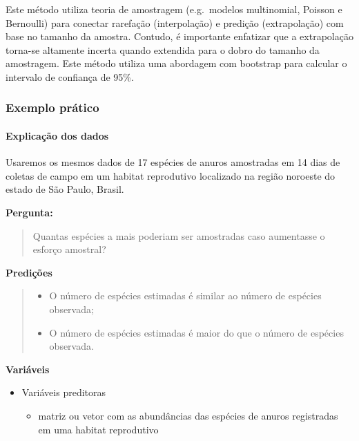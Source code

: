 \documentclass[
]{book}
\providecommand{\tightlist}{%
  \setlength{\itemsep}{0pt}\setlength{\parskip}{0pt}}
\begin{document}
Este método utiliza teoria de amostragem (e.g.~modelos multinomial, Poisson e Bernoulli) para conectar rarefação (interpolação) e predição (extrapolação) com base no tamanho da amostra. Contudo, é importante enfatizar que a extrapolação torna-se altamente incerta quando extendida para o dobro do tamanho da amostragem. Este método utiliza uma abordagem com bootstrap para calcular o intervalo de confiança de 95\%.

\hypertarget{exemplo-pruxe1tico}{%
\subsubsection{Exemplo prático}\label{exemplo-pruxe1tico}}

\hypertarget{explicauxe7uxe3o-dos-dados-6}{%
\paragraph{Explicação dos dados}\label{explicauxe7uxe3o-dos-dados-6}}

Usaremos os mesmos dados de 17 espécies de anuros amostradas em 14 dias de coletas de campo em um habitat reprodutivo localizado na região noroeste do estado de São Paulo, Brasil.

\textbf{Pergunta:}

\begin{quote}
Quantas espécies a mais poderiam ser amostradas caso aumentasse o esforço amostral?
\end{quote}

\textbf{Predições}

\begin{quote}
\begin{itemize}
\tightlist
\item
  O número de espécies estimadas é similar ao número de espécies observada;
\item
  O número de espécies estimadas é maior do que o número de espécies observada.
\end{itemize}
\end{quote}

\textbf{Variáveis}

\begin{itemize}
\tightlist
\item
  Variáveis preditoras

  \begin{itemize}
  \tightlist
  \item
    matriz ou vetor com as abundâncias das espécies de anuros registradas em uma habitat reprodutivo
  \end{itemize}
\end{itemize}
\end{document}
